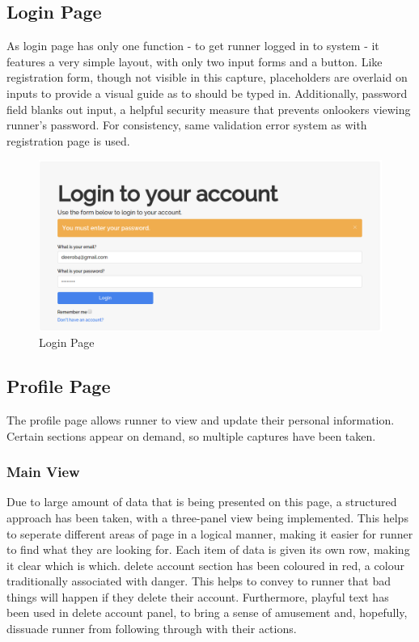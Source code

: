 \documentclass{article}[12pt,a4paper]
\begin{document}
\subsection{Login Page}
As login page has only one function - to get runner logged in to system - it features a very simple layout, with only two input forms and a button. Like registration form, though not visible in this capture, placeholders are overlaid on inputs to provide a visual guide as to should be typed in. Additionally, password field blanks out input, a helpful security measure that prevents onlookers viewing runner's password. For consistency, same validation error system as with registration page is used.

\begin{figure}[h!]
  \includegraphics[scale=0.35]{final_ui/login}
  \caption{Login Page}
\end{figure}
\clearpage

\subsection{Profile Page}
The profile page allows runner to view and update their personal information. Certain sections appear on demand, so multiple captures have been taken.

\subsubsection{Main View}
Due to large amount of data that is being presented on this page, a structured approach has been taken, with a three-panel view being implemented. This helps to seperate different areas of page in a logical manner, making it easier for runner to find what they are looking for. Each item of data is given its own row, making it clear which is which. delete account section has been coloured in red, a colour traditionally associated with danger. This helps to convey to runner that bad things will happen if they delete their account. Furthermore, playful text has been used in delete account panel, to bring a sense of amusement and, hopefully, dissuade runner from following through with their actions.
\end{document}
